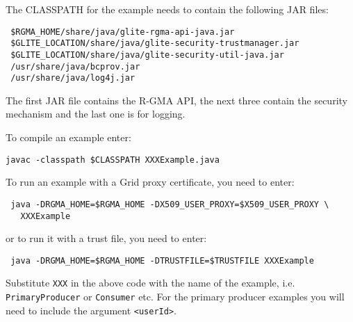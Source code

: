 The CLASSPATH for the example needs to contain the following JAR
files:

\begin{verbatim}
 $RGMA_HOME/share/java/glite-rgma-api-java.jar
 $GLITE_LOCATION/share/java/glite-security-trustmanager.jar
 $GLITE_LOCATION/share/java/glite-security-util-java.jar
 /usr/share/java/bcprov.jar 
 /usr/share/java/log4j.jar
\end{verbatim}

The first JAR file contains the R-GMA API, the next three contain the
security mechanism and the last one is for logging.


To compile an example enter:
\begin{verbatim}
javac -classpath $CLASSPATH XXXExample.java
\end{verbatim}

To run an example with a Grid proxy certificate, you need to enter:

\begin{verbatim}
 java -DRGMA_HOME=$RGMA_HOME -DX509_USER_PROXY=$X509_USER_PROXY \
   XXXExample
\end{verbatim}

or to run it with a trust file, you need to enter:

\begin{verbatim}
 java -DRGMA_HOME=$RGMA_HOME -DTRUSTFILE=$TRUSTFILE XXXExample
\end{verbatim}

Substitute \texttt{XXX} in the above code with the name of the
example, i.e. \texttt{PrimaryProducer} or \texttt{Consumer} etc. For
the primary producer examples you will need to include the argument
\verb$<userId>$.
